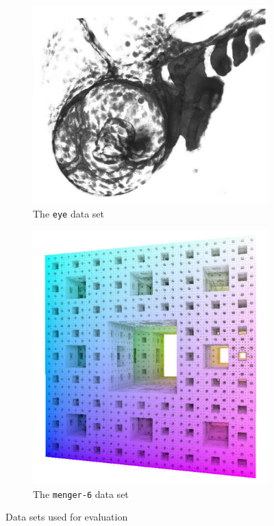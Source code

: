 \begin{figure}
\begin{subfigure}{.4\textwidth}
\centering
    \includegraphics[width=\textwidth]{figures/eye.png} 
    \caption{The \texttt{eye} data set}
    \label{fig:dataset-eye}
\end{subfigure}
\begin{subfigure}{.4\textwidth}
\centering
    \includegraphics[width=\textwidth]{figures/menger.png} 
    \caption{The \texttt{menger-6} data set}
    \label{fig:dataset-menger}
\end{subfigure}

\caption{Data sets used for evaluation}
\label{fig:datasets}
\end{figure}

